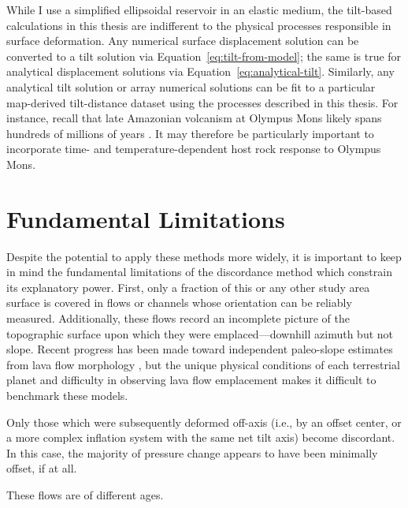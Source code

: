 While I use a simplified ellipsoidal reservoir in an elastic medium, the tilt-based calculations in this thesis are indifferent to the physical processes responsible in surface deformation. Any numerical surface displacement solution can be converted to a tilt solution via Equation~\eqref{eq:tilt-from-model}; the same is true for analytical displacement solutions via Equation~\eqref{eq:analytical-tilt}. Similarly, any analytical tilt solution or array numerical solutions can be fit to a particular map-derived tilt-distance dataset using the processes described in this thesis. For instance, recall that late Amazonian volcanism at Olympus Mons likely spans hundreds of millions of years \parencite{neukum_recent_2004}. It may therefore be particularly important to incorporate time- and temperature-dependent host rock response \parencite[e.g.,][]{gregg_catastrophic_2012} to Olympus Mons.

\section{Fundamental Limitations}

Despite the potential to apply these methods more widely, it is important to keep in mind the fundamental limitations of the discordance method which constrain its explanatory power. First, only a fraction of this or any other study area surface is covered in flows or channels whose orientation can be reliably measured.  Additionally, these flows record an incomplete picture of the topographic surface upon which they were emplaced---downhill azimuth but not slope. Recent progress has been made toward independent paleo-slope estimates from lava flow morphology \parencite{wadge_lobes_1991, peitersen_correlations_2000, peters_lava_2021}, but the unique physical conditions of each terrestrial planet and difficulty in observing lava flow emplacement makes it difficult to benchmark these models.

Only those which were subsequently deformed off-axis (i.e., by an offset center, or a more complex inflation system with the same net tilt axis) become discordant. In this case, the majority of pressure change appears to have been minimally offset, if at all.

These flows are of different ages.

